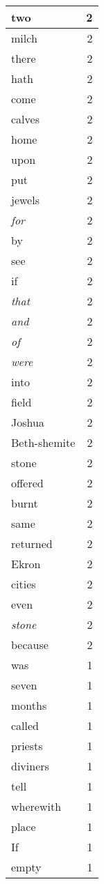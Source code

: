 \begin{center}
\begin{longtable}{l|r}
two & 2 \\ \hline
milch & 2 \\ \hline
there & 2 \\ \hline
hath & 2 \\ \hline
come & 2 \\ \hline
calves & 2 \\ \hline
home & 2 \\ \hline
upon & 2 \\ \hline
put & 2 \\ \hline
jewels & 2 \\ \hline
\emph{for} & 2 \\ \hline
by & 2 \\ \hline
see & 2 \\ \hline
if & 2 \\ \hline
\emph{that} & 2 \\ \hline
\emph{and} & 2 \\ \hline
\emph{of} & 2 \\ \hline
\emph{were} & 2 \\ \hline
into & 2 \\ \hline
field & 2 \\ \hline
Joshua & 2 \\ \hline
Beth-shemite & 2 \\ \hline
stone & 2 \\ \hline
offered & 2 \\ \hline
burnt & 2 \\ \hline
same & 2 \\ \hline
returned & 2 \\ \hline
Ekron & 2 \\ \hline
cities & 2 \\ \hline
even & 2 \\ \hline
\emph{stone} & 2 \\ \hline
because & 2 \\ \hline
was & 1 \\ \hline
seven & 1 \\ \hline
months & 1 \\ \hline
called & 1 \\ \hline
priests & 1 \\ \hline
diviners & 1 \\ \hline
tell & 1 \\ \hline
wherewith & 1 \\ \hline
place & 1 \\ \hline
If & 1 \\ \hline
empty & 1 \\ \hline

\end{longtable}
\end{center}
